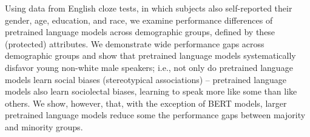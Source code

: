 Using data from English cloze tests, in which subjects also self-reported their gender, age, education, and race, we examine performance differences of pretrained language models across demographic groups, defined by these (protected) attributes. We demonstrate wide performance gaps across demographic groups and show that pretrained language models systematically disfavor young non-white male speakers; i.e., not only do pretrained language models learn social biases (stereotypical associations) -- pretrained language models  also learn sociolectal biases, learning to speak more like some than like others. We show, however, that, with the exception of BERT models, larger pretrained language models reduce some the performance gaps between majority and minority groups.
